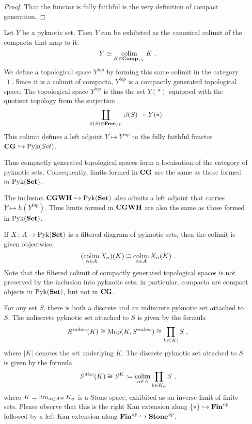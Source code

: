 \begin{proof}
	That the functor is fully faithful is the very definition of compact generation.
\end{proof}

\begin{cnstr}
	Let $ Y $ be a pyknotic set.
	Then $ Y $ can be exhibited as the canonical colimit of the compacta that map to it:
	\[
		Y \simeq \colim_{K \in \Comp_{/Y}} K \period
	\]
	We define a topological space $ Y^{\textit{top}} $ by forming this same colimit in the category $ \Top $.
	Since it is a colimit of compacta, $ Y^{\textit{top}} $ is a compactly generated topological space.
	The topological space $ Y^{\textit{top}} $ is thus the set $ Y(\ast) $ equipped with the quotient topology from the surjection
	\[
		\coprod_{\beta(S) \in \textbf{\textup{Free}}_{/Y}} \beta(S) \twoheadrightarrow Y(\ast)
	\]
	This colimit defines a left adjoint $ Y \mapsto Y^{\textit{top}} $ to the fully faithful functor $ \textbf{\textup{CG}} \hookrightarrow \operatorname{Pyk}(Set) $.

	Thus compactly generated topological spaces form a locaisation of the category of pyknotic sets.
	Consequently, limits formed in $ \textbf{\textup{CG}} $ are the same as those formed in $ \operatorname{Pyk}(\textbf{\textup{Set}}) $.
	
	The inclusion $ \textbf{\textup{CGWH}} \hookrightarrow \operatorname{Pyk}(\textbf{\textup{Set}}) $ also admits a left adjoint that carries $ Y \mapsto h(Y^{\textit{top}}) $.
	Thus limits formed in $ \textbf{\textup{CGWH}} $ are also the same as those formed in $ \operatorname{Pyk}(\textbf{\textup{Set}}) $.
\end{cnstr}

\begin{nul}
	If $ X \colon A \to \operatorname{Pyk}(\textbf{\textup{Set}}) $ is a filtered diagram of pyknotic sets, then the colimit is given objectwise:
	\[
		(\colim_{\alpha \in A} X_{\alpha})(K) \cong \colim_{\alpha \in A} X_{\alpha}(K) \period
	\]
	Note that the filtered colimit of compactly generated topological spaces is not preserved by the inclusion into pyknotic sets;
	in particular, compacta are compact objects in $ \operatorname{Pyk}(\textbf{\textup{Set}}) $, but not in $ \textbf{\textup{CG}} $.
\end{nul}

\begin{exm}
	For any set $ S $, there is both a discrete and an indiscrete pyknotic set attached to $ S $.
	The indiscrete pyknotic set attached to $ S $ is given by the formula
	\[
		S^{\indisc}(K) \cong \Map(K, S^{\indisc}) \cong \prod_{k \in |K|} S \comma
	\]
	where $ |K|$ denotes the set underlying $ K $. 
	The discrete pyknotic set attached to $ S $ is given by the formula
	\[
		S^{\disc}(K) \cong S^K \coloneq \colim_{\alpha \in A} \prod_{k \in K_{\alpha}} S \comma
	\]
	where $ K = \lim_{\alpha \in A^{\textit{op}}} K_{\alpha} $ is a Stone space, exhibited as an inverse limit of finite sets.
	Please observe that this is the right Kan extension along $ \{ \ast \} \hookrightarrow \textbf{\textup{Fin}}^{\textit{op}} $ followed by a left Kan extension along $ \textbf{\textup{Fin}}^{\textit{op}} \hookrightarrow \textbf{\textup{Stone}}^{\textit{op}} $.
\end{exm}

